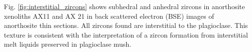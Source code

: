 \documentclass[11pt,letterpaper]{article}
\begin{document}
Fig. \ref{fig:interstitial_zircons} shows subhedral and anhedral zircons in anorthosite xenoliths AX11 and AX 21 in back scattered electron (BSE) images of anorthosite thin sections. All zircons found are interstitial to the plagioclase. This texture is consistent with the interpretation of a zircon formation from interstitial melt liquids preserved in plagioclase mush.



\end{document}

